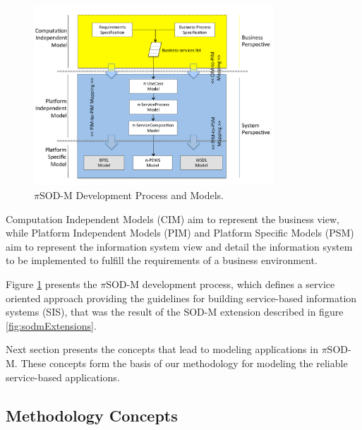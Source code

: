 \begin{figure} [ht!]
\centering
\includegraphics[width=0.8\textwidth]{chapters/methodology/figs/PiSOD-MProcess}
\caption{$\pi$SOD-M Development Process and Models.}
\label{fig:developmentProcess}
\end{figure}


 Computation Independent Models (CIM) aim to represent the business view, while
 Platform Independent Models (PIM) and Platform Specific Models (PSM) aim
 to represent the information system view and detail the information system to
 be implemented to fulfill the requirements of a business environment.

 Figure \ref{fig:developmentProcess} presents the $\pi$SOD-M development
 process, which defines a service oriented approach providing the guidelines for
 building service-based information systems (SIS), that was the result of the
 SOD-M extension described in figure \ref{fig:sodmExtensions}. 
 

Next section presents the concepts that lead to modeling applications in
$\pi$SOD-M. These concepts form the basis of our methodology for modeling the
reliable service-based applications. 

\subsection{Methodology Concepts} 
\label{sec:concepts}

